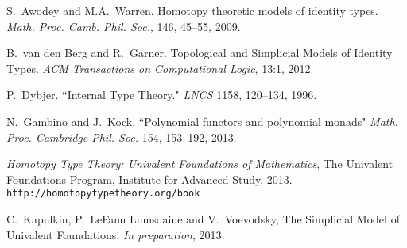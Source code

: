 \documentclass[11pt]{article}
\newcommand{\C}{\ensuremath{\mathbb{C}}}
\newcommand{\psh}[1]{\ensuremath{\mathsf{Set}^{#1^{\mathrm{op}}}}}
\theoremstyle{remark}
\theoremstyle{definition}
\begin{document}
%
%
%

\begin{thebibliography}{300}

S.~Awodey and M.A.~Warren. Homotopy theoretic models of identity types. \emph{Math. Proc. Camb. Phil. Soc.}, 146, 45--55, 2009.

B.~van den Berg and R.~Garner. Topological and Simplicial Models of Identity Types. \emph{ACM Transactions on Computational Logic}, 13:1, 2012.

P.~Dybjer. ``Internal Type Theory." \emph{LNCS} 1158, 120--134, 1996.

N.~Gambino and J.~Kock, ``Polynomial functors and polynomial monads"
\emph{Math. Proc. Cambridge Phil. Soc.} 154, 153--192, 2013.


\emph{Homotopy Type Theory: Univalent Foundations of Mathematics}, The Univalent Foundations Program, Institute for Advanced Study, 2013. {\tt http://homotopytypetheory.org/book}

C.~Kapulkin, P.~LeFanu Lumsdaine and V.~Voevodsky, The Simplicial Model of Univalent Foundations. \emph{In preparation}, 2013.

%
\end{thebibliography}

\end{document}
